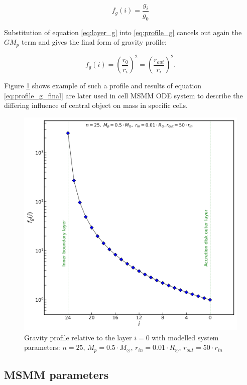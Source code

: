 \begin{equation} \label{eq:profile_g}
f_g(i) = \frac{g_i}{g_0}
\end{equation}

Substitution of equation \ref{eq:layer_g} into \ref{eq:profile_g} cancels out again the $GM_p$ term and gives the final form of gravity profile:

\begin{equation} \label{eq:profile_g_final}
f_g(i) = \left(\frac{r_{0}}{r_i}\right)^2=\left(\frac{r_{out}}{r_i}\right)^2.
\end{equation}

Figure \ref{fig:profile_g} shows example of such a profile and results of equation \ref{eq:profile_g_final} are later used in cell MSMM ODE system to describe the differing influence of central object on mass in specific cells. 

\begin{figure}[H]
\centering
\includegraphics[width=0.9\columnwidth]{img/profile_g.png}
\caption{Gravity profile relative to the layer $i = 0$ with modelled system parameters: $n=25$, $M_p = 0.5 \cdot M_{\odot}$, $r_{in} = 0.01 \cdot R_{\odot}$, $r_{out} = 50 \cdot r_{in}$}
\label{fig:profile_g}
\end{figure}

\subsection{MSMM parameters}



